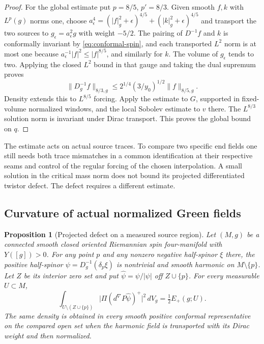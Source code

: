 \documentclass[11pt]{article}
\numberwithin{equation}{section}
\newtheorem{proposition}[theorem]{Proposition}
\begin{document}
\begin{proof}
For the global estimate put \(p=8/5\), \(p'=8/3\).
Given smooth \(f,k\) with \(L^p(g)\) norms one, choose
\(a_\epsilon^4=(|f|_g^2+\epsilon)^{4/5}
+(|k|_g^2+\epsilon)^{4/5}\) and transport the two sources to
\(g_\epsilon=a_\epsilon^2g\) with weight \(-5/2\).
The pairing of \(D^{-1}f\) and \(k\) is conformally invariant
by \eqref{eq:conformal-spin}, and each transported \(L^2\) norm
is at most one because \(a_\epsilon^{-1}|f|^2\le |f|^{8/5}\),
and similarly for \(k\). The volume of \(g_\epsilon\) tends to
two. Applying the closed \(L^2\) bound in that gauge and taking
the dual supremum proves
\[
 \|D_g^{-1}f\|_{8/3,g}\le 2^{1/4}(3/y_0)^{1/2}\|f\|_{8/5,g}.
\]
Density extends this to \(L^{8/5}\) forcing. Apply the estimate
to \(G\), supported in fixed-volume normalized windows, and the
local Sobolev estimate to \(v\) there. The \(L^{8/3}\) solution
norm is invariant under Dirac transport. This proves the global
bound on \(q\).
\end{proof}

The estimate acts on actual source traces. To compare two specific
end fields one still needs both trace mismatches in a common
identification at their respective seams and control of the
regular forcing of the chosen interpolation. A small solution in
the critical mass norm does not bound its projected differentiated
twistor defect. The defect requires a different estimate.

\subsection{Curvature of actual normalized Green fields}

\begin{proposition}[Projected defect on a measured source region]\label{prop:actual-dirac-defect}
Let \((M,g)\) be a connected smooth closed oriented Riemannian spin
four-manifold with \(Y([g])>0\). For any point \(p\) and any nonzero
negative half-spinor \(\xi\) there, the positive half-spinor
\(\psi=D_g^{-1}(\delta_p\xi)\) is nontrivial and smooth harmonic on
\(M\setminus\{p\}\). Let \(Z\) be its interior zero set and put
\(\widehat\psi=\psi/|\psi|\) off \(Z\cup\{p\}\).
For every measurable \(U\subset M\),
\begin{equation}\label{eq:actual-dirac-defect}
 \int_{U\setminus(Z\cup\{p\})}
       \big|\Pi(d^\nabla P\widehat\psi)^+\big|^2\,dV_g
 =\tfrac12 E_+(g;U).
\end{equation}
The same density is obtained in every smooth positive conformal
representative on the compared open set when the harmonic field is
transported with its Dirac weight and then normalized.
\end{proposition}
\end{document}
